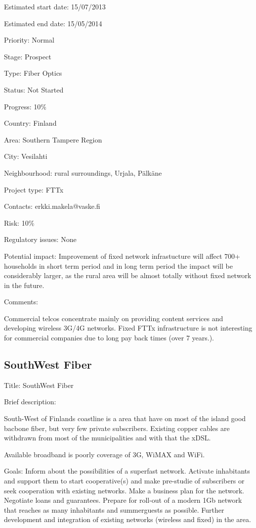 \documentclass[draftclsnofoot,12pt,journal,onecolumn]{IEEEtran}
\begin{document}
Estimated start date: 15/07/2013 

Estimated end date: 15/05/2014 

Priority: Normal 

Stage: Prospect 

Type: Fiber Optics 

Status: Not Started 

Progress: 10\% 

Country: Finland 

Area: Southern Tampere Region 

City: Vesilahti 

Neighbourhood: rural surroundings, Urjala, Pälkäne 

Project type: FTTx 

Contacts: erkki.makela@vaske.fi

Risk: 10\% 

Regulatory issues: None 

Potential impact: Improvement of fixed network infrastucture will affect 700+ 
households in short term period and in long term period the impact will be 
considerably larger, as the rural area will be almost totally without fixed 
network in the future. 

Comments: 

Commercial telcos concentrate mainly on providing content services and 
developing wireless 3G/4G networks. 
Fixed FTTx infrastructure is not interesting for commercial companies due to 
long pay back times (over 7 years.). 

\subsection{SouthWest Fiber} 

Title: SouthWest Fiber 

Brief description: 

South-West of Finlands coastline is a area that have on most of the island 
good bacbone fiber, but very few private subscribers. Existing copper cables 
are withdrawn from most of the municipalities and with that the xDSL. 

Available broadband is poorly coverage of 3G, WiMAX and WiFi. 

Goals: Inform about the possibilities of a superfast network. Activate 
inhabitants and support them to start cooperative(s) and make pre-studie of 
subscribers or seek cooperation with existing networks. Make a business plan 
for the network. Negotiate loans and guarantees. Prepare for roll-out of a 
modern 1Gb network that reaches as many inhabitants and summerguests as 
possible. Further development and integration of existing networks (wireless 
and fixed) in the area. 
\end{document}
